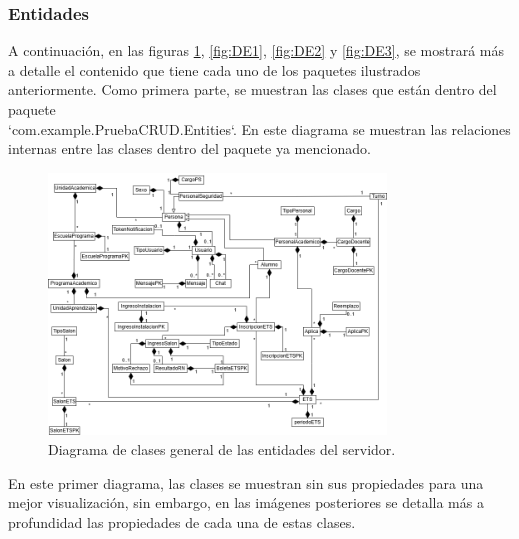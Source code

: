 \subsubsection{Entidades}
A continuación, en las figuras \ref{fig:DCERed}, \ref{fig:DE1}, \ref{fig:DE2} y \ref{fig:DE3}, se mostrará más a detalle el contenido que tiene cada uno de los paquetes ilustrados anteriormente. Como primera parte, se muestran las clases que están dentro del paquete \\ `com.example.PruebaCRUD.Entities`. En este diagrama se muestran las relaciones internas entre las clases dentro del paquete ya mencionado.

\begin{figure}[htbp!]
	\begin{center}
		\includegraphics[width=0.8\textwidth]{Clases/DCE Reducido.png}
		\caption{Diagrama de clases general de las entidades del servidor.}
		\label{fig:DCERed}
	\end{center}
\end{figure}

 En este primer diagrama, las clases se muestran sin sus propiedades para una mejor visualización, sin embargo, en las imágenes posteriores se detalla más a profundidad las propiedades de cada una de estas clases.

\newpage

